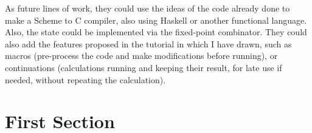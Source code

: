 As future lines of work, they could use the ideas of the code already done to make a Scheme to C compiler, also using Haskell or another functional language. Also, the state could be implemented via the fixed-point combinator. They could also add the features proposed in the tutorial in which I have drawn, such as macros (pre-process the code and make modifications before running), or continuations (calculations running and keeping their result, for late use if needed, without repeating the calculation). 

\section{First Section}
\label{6:sec:1}